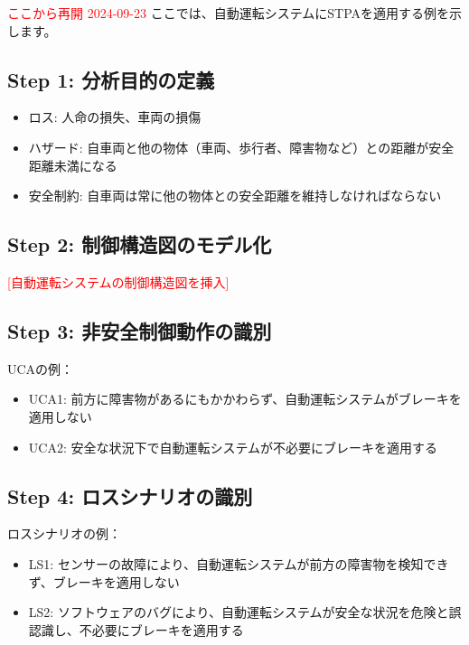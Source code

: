 \textcolor{red}{ここから再開 2024-09-23}
ここでは、自動運転システムにSTPAを適用する例を示します。

\subsection{Step 1: 分析目的の定義}

\begin{itemize}
    \item ロス: 人命の損失、車両の損傷
    \item ハザード: 自車両と他の物体（車両、歩行者、障害物など）との距離が安全距離未満になる
    \item 安全制約: 自車両は常に他の物体との安全距離を維持しなければならない
\end{itemize}

\subsection{Step 2: 制御構造図のモデル化}

\textcolor{red}{[自動運転システムの制御構造図を挿入]}

\subsection{Step 3: 非安全制御動作の識別}

UCAの例：
\begin{itemize}
    \item UCA1: 前方に障害物があるにもかかわらず、自動運転システムがブレーキを適用しない
    \item UCA2: 安全な状況下で自動運転システムが不必要にブレーキを適用する
\end{itemize}

\subsection{Step 4: ロスシナリオの識別}

ロスシナリオの例：
\begin{itemize}
    \item LS1: センサーの故障により、自動運転システムが前方の障害物を検知できず、ブレーキを適用しない
    \item LS2: ソフトウェアのバグにより、自動運転システムが安全な状況を危険と誤認識し、不必要にブレーキを適用する
\end{itemize}

